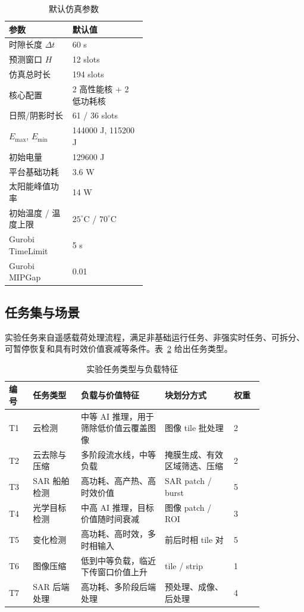 \begin{table}[t]
\centering
\caption{默认仿真参数}
\label{tab:params}
\begin{tabularx}{\linewidth}{p{0.46\linewidth}X}
\toprule
参数 & 默认值 \\
\midrule
时隙长度 $\Delta t$ & 60 s \\
预测窗口 $H$ & 12 slots \\
仿真总时长 & 194 slots \\
核心配置 & 2 高性能核 + 2 低功耗核 \\
日照/阴影时长 & 61 / 36 slots \\
$E_{\max}$, $E_{\min}$ & 144000 J, 115200 J \\
初始电量 & 129600 J \\
平台基础功耗 & 3.6 W \\
太阳能峰值功率 & 14 W \\
初始温度 / 温度上限 & $25^\circ$C / $70^\circ$C \\
Gurobi TimeLimit & 5 s \\
Gurobi MIPGap & 0.01 \\
\bottomrule
\end{tabularx}
\end{table}

\subsection{任务集与场景}

实验任务来自遥感载荷处理流程，满足非基础运行任务、非强实时任务、可拆分、可暂停恢复和具有时效价值衰减等条件。表~\ref{tab:tasks} 给出任务类型。

\begin{table}[t]
\centering
\caption{实验任务类型与负载特征}
\label{tab:tasks}
\begin{tabular}{p{0.08\linewidth}p{0.16\linewidth}p{0.28\linewidth}p{0.23\linewidth}p{0.10\linewidth}}
\toprule
编号 & 任务类型 & 负载与价值特征 & 块划分方式 & 权重 \\
\midrule
T1 & 云检测 & 中等 AI 推理，用于筛除低价值云覆盖图像 & 图像 tile 批处理 & 2 \\
T2 & 云去除与压缩 & 多阶段流水线，中等负载 & 掩膜生成、有效区域筛选、压缩 & 2 \\
T3 & SAR 船舶检测 & 高功耗、高产热、高时效价值 & SAR patch / burst & 5 \\
T4 & 光学目标检测 & 中高 AI 推理，目标价值随时间衰减 & 图像 patch / ROI & 3 \\
T5 & 变化检测 & 高功耗、高时效，多时相输入 & 前后时相 tile 对 & 5 \\
T6 & 图像压缩 & 低到中等负载，临近下传窗口价值上升 & tile / strip & 1 \\
T7 & SAR 后端处理 & 高功耗、多阶段后端处理 & 预处理、成像、后处理 & 4 \\
\bottomrule
\end{tabular}
\end{table}

